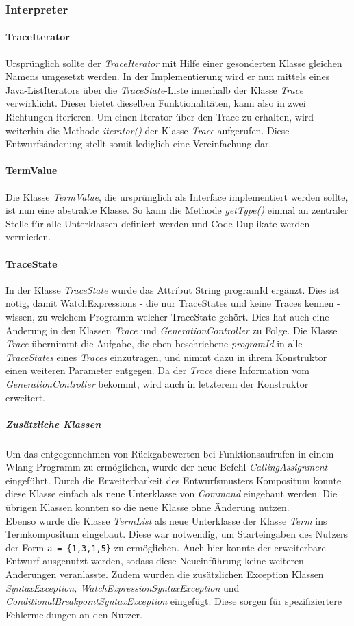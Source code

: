 \documentclass[parskip=full]{scrartcl}
\begin{document}
\subsubsection{Interpreter}
\paragraph{TraceIterator}
Ursprünglich sollte der \textit{TraceIterator} mit Hilfe einer gesonderten Klasse gleichen Namens umgesetzt werden. In der Implementierung wird er nun mittels eines Java-ListIterators über die \textit{TraceState}-Liste innerhalb der Klasse \textit{Trace} verwirklicht. Dieser bietet dieselben Funktionalitäten, kann also in zwei Richtungen iterieren. Um einen Iterator über den Trace zu erhalten, wird weiterhin die Methode \textit{iterator()} der Klasse \textit{Trace} aufgerufen. Diese Entwurfsänderung stellt somit lediglich eine Vereinfachung dar.
\paragraph{TermValue}
Die Klasse \textit{TermValue}, die ursprünglich als Interface implementiert werden sollte, ist nun eine abstrakte Klasse. So kann die Methode \textit{getType()} einmal an zentraler Stelle für alle Unterklassen definiert werden und Code-Duplikate werden vermieden.
\paragraph{TraceState}
In der Klasse \textit{TraceState} wurde das Attribut String programId ergänzt. Dies ist nötig, damit WatchExpressions - die nur TraceStates und keine Traces kennen - wissen, zu welchem Programm welcher TraceState gehört. Dies hat auch eine Änderung in den Klassen \textit{Trace} und \textit{GenerationController} zu Folge. Die Klasse \textit{Trace} übernimmt die Aufgabe, die eben beschriebene \textit{programId} in alle \textit{TraceStates} eines \textit{Traces} einzutragen, und nimmt dazu in ihrem Konstruktor einen weiteren Parameter entgegen. Da der \textit{Trace} diese Information vom  \textit{GenerationController} bekommt, wird auch in letzterem der Konstruktor erweitert.
\subparagraph{Zusätzliche Klassen}
Um das entgegennehmen von Rückgabewerten bei Funktionsaufrufen in einem Wlang-Programm zu ermöglichen, wurde der neue Befehl \textit{CallingAssignment} eingeführt. Durch die Erweiterbarkeit des Entwurfsmusters Kompositum konnte diese Klasse einfach als neue Unterklasse von \textit{Command} eingebaut werden. Die übrigen Klassen konnten so die neue Klasse ohne Änderung nutzen.\\
Ebenso wurde die Klasse \textit{TermList} als neue Unterklasse der Klasse \textit{Term} ins Termkompositum eingebaut. Diese war notwendig, um Starteingaben des Nutzers der Form \texttt{a = \{1,3,1,5\}} zu ermöglichen. Auch hier konnte der erweiterbare Entwurf ausgenutzt werden, sodass diese Neueinführung keine weiteren Änderungen veranlasste.
Zudem wurden die zusätzlichen Exception Klassen \textit{SyntaxException, WatchExpressionSyntaxException} und \textit{ConditionalBreakpointSyntaxException} eingefügt. Diese sorgen für spezifiziertere Fehlermeldungen an den Nutzer.
\end{document}
